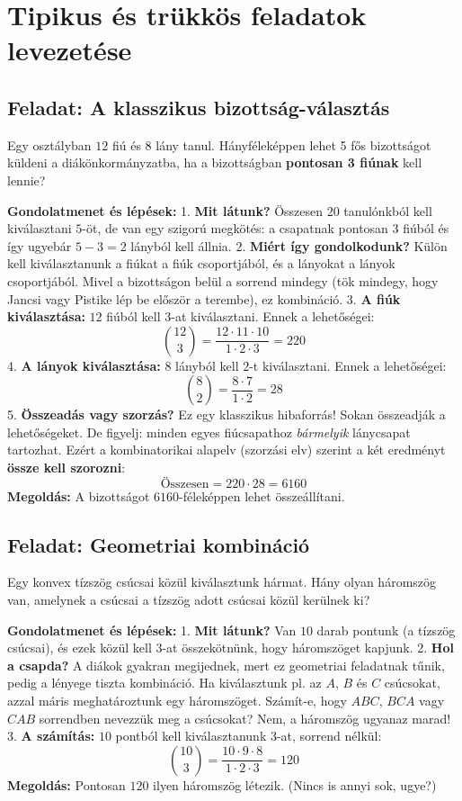 \documentclass[11pt,a4paper]{article}
\begin{document}
\section{Tipikus és trükkös feladatok levezetése}

\subsection*{Feladat: A klasszikus bizottság-választás}
\begin{tcolorbox}
Egy osztályban $12$ fiú és $8$ lány tanul. Hányféleképpen lehet 5 fős bizottságot küldeni a diákönkormányzatba, ha a bizottságban \textbf{pontosan 3 fiúnak} kell lennie?
\end{tcolorbox}

\textbf{Gondolatmenet és lépések:}
1. \textbf{Mit látunk?} Összesen $20$ tanulónkból kell kiválasztani $5$-öt, de van egy szigorú megkötés: a csapatnak pontosan $3$ fiúból és így ugyebár $5 - 3 = 2$ lányból kell állnia.
2. \textbf{Miért így gondolkodunk?} Külön kell kiválasztanunk a fiúkat a fiúk csoportjából, és a lányokat a lányok csoportjából. Mivel a bizottságon belül a sorrend mindegy (tök mindegy, hogy Jancsi vagy Pistike lép be először a terembe), ez kombináció.
3. \textbf{A fiúk kiválasztása:} $12$ fiúból kell $3$-at kiválasztani. Ennek a lehetőségei:
$$\binom{12}{3} = \frac{12 \cdot 11 \cdot 10}{1 \cdot 2 \cdot 3} = 220$$
4. \textbf{A lányok kiválasztása:} $8$ lányból kell $2$-t kiválasztani. Ennek a lehetőségei:
$$\binom{8}{2} = \frac{8 \cdot 7}{1 \cdot 2} = 28$$
5. \textbf{Összeadás vagy szorzás?} Ez egy klasszikus hibaforrás! Sokan összeadják a lehetőségeket. De figyelj: minden egyes fiúcsapathoz \textit{bármelyik} lánycsapat tartozhat. Ezért a kombinatorikai alapelv (szorzási elv) szerint a két eredményt \textbf{össze kell szorozni}:
$$\text{Összesen} = 220 \cdot 28 = 6160$$
\textbf{Megoldás:} A bizottságot $6160$-féleképpen lehet összeállítani.

\subsection*{Feladat: Geometriai kombináció}
\begin{tcolorbox}
Egy konvex tízszög csúcsai közül kiválasztunk hármat. Hány olyan háromszög van, amelynek a csúcsai a tízszög adott csúcsai közül kerülnek ki?
\end{tcolorbox}

\textbf{Gondolatmenet és lépések:}
1. \textbf{Mit látunk?} Van $10$ darab pontunk (a tízszög csúcsai), és ezek közül kell $3$-at összekötnünk, hogy háromszöget kapjunk.
2. \textbf{Hol a csapda?} A diákok gyakran megijednek, mert ez geometriai feladatnak tűnik, pedig a lényege tiszta kombináció. Ha kiválasztunk pl. az $A$, $B$ és $C$ csúcsokat, azzal máris meghatároztunk egy háromszöget. Számít-e, hogy $ABC$, $BCA$ vagy $CAB$ sorrendben nevezzük meg a csúcsokat? Nem, a háromszög ugyanaz marad!
3. \textbf{A számítás:} $10$ pontból kell kiválasztanunk $3$-at, sorrend nélkül:
$$\binom{10}{3} = \frac{10 \cdot 9 \cdot 8}{1 \cdot 2 \cdot 3} = 120$$
\textbf{Megoldás:} Pontosan $120$ ilyen háromszög létezik. (Nincs is annyi sok, ugye?)
\end{document}
